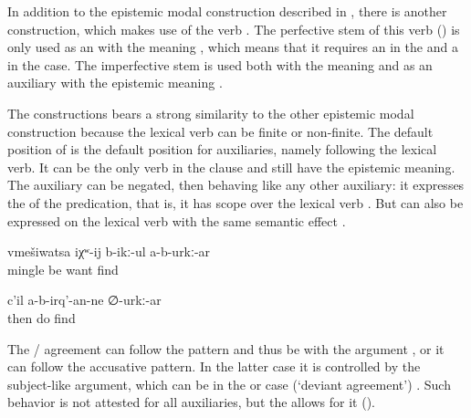 In addition to the epistemic modal construction described in , there is another construction, which makes use of the verb  . The perfective stem of this verb () is only used as an  with the meaning , which means that it requires an  in the  and a  in the  case. The imperfective stem  is used both with the meaning  and as an auxiliary with the epistemic meaning .

The  constructions bears a strong similarity to the other epistemic modal construction because the lexical verb can be finite or non-finite. The default position of  is the default position for auxiliaries, namely following the lexical verb. It can be the only verb in the clause and still have the epistemic meaning. The auxiliary can be negated, then behaving like any other auxiliary: it expresses the  of the predication, that is, it has scope over the lexical verb . But  can also be expressed on the lexical verb with the same semantic effect .

\begin{exe}
	\ex	\label{ex:(He) probably does not want to get involved}
	\gll	vmešiwatsa	iχʷ-ij	b-ikː-ul	a-b-urkː-ar\\
		mingle	be	want	find\\
	\glt	{}

	\ex	\label{ex:‎Then he will probably not do (this again)}
	\gll	c'il	a-b-irq'-an-ne	∅-urkː-ar\\
		then	do	find\\
	\glt	{}
\end{exe}

The / agreement can follow the  pattern and thus be with the  argument , or it can follow the accusative pattern. In the latter case it is controlled by the subject-like argument, which can be in the  or  case (`deviant  agreement') . Such behavior is not attested for all auxiliaries, but the  allows for it ().

